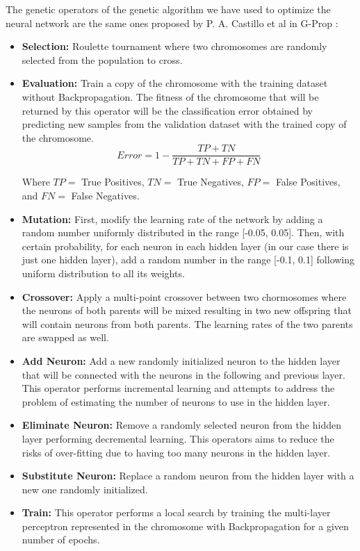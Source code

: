 The genetic operators of the genetic algorithm we have used  to optimize the neural network are the same ones proposed by P. A. Castillo et al in G-Prop \cite{gprop}:

\begin{itemize}
	\item \textbf{Selection:} Roulette tournament where two chromosomes are randomly selected from the population to cross.
	
	\item \textbf{Evaluation:} Train a copy of the chromosome with the training dataset without Backpropagation. The fitness of the chromosome that will be returned by this operator will be the classification error obtained by predicting new samples from the validation dataset with the trained copy of the chromosome.
	$$ Error = 1 - \frac{TP + TN}{TP + TN + FP + FN}  $$
	
	Where $TP = $ True Positives, $TN = $ True Negatives, $FP = $ False Positives, and $FN = $ False Negatives.
	
	\item \textbf{Mutation:} First, modify the learning rate of the network by adding a random number uniformly distributed in the range [-0.05, 0.05]. Then, with certain probability, for each neuron in each hidden layer (in our case there is just one hidden layer), add a random number in the range [-0.1, 0.1] following uniform distribution to all its weights.
	
	\item \textbf{Crossover:} Apply a multi-point crossover between two chormosomes where the neurons of both parents will be mixed resulting in two new offspring that will contain neurons from both parents. The learning rates of the two parents are swapped as well.
	
	\item \textbf{Add Neuron:} Add a new randomly initialized neuron to the hidden layer that will be connected with the neurons in the following and previous layer. This operator performs incremental learning and attempts to address the problem of estimating the number of neurons to use in the hidden layer.
	
	\item \textbf{Eliminate Neuron:} Remove a randomly selected neuron from the hidden layer performing decremental learning. This operators aims to reduce the risks of over-fitting due to having too many neurons in the hidden layer.
	
	\item \textbf{Substitute Neuron:} Replace a random neuron from the hidden layer with a new one randomly initialized.
	
	\item \textbf{Train:} This operator performs a local search by training the multi-layer perceptron represented in the chromosome with Backpropagation \cite{backpropagation} for a given number of epochs.
\end{itemize}

